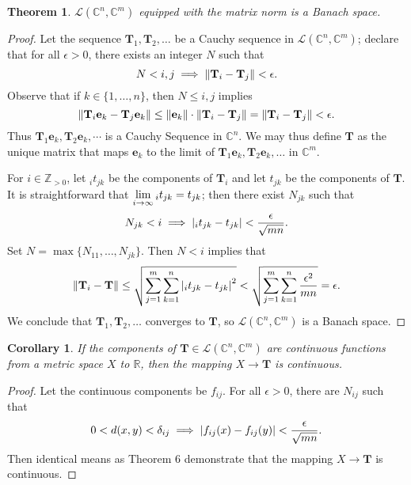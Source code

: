 \documentclass[11pt]{article}
\renewcommand{\vec}[1]{\mathbf{#1}}
\newcommand{\mat}[1]{\mathbf{#1}}
\newtheorem{theorem}{Theorem}
\newtheorem{corollary}{Corollary}
\begin{document}
\begin{theorem}
	$\mathcal{L}(\mathbb{C}^{n}, \mathbb{C}^{m})$ equipped with the matrix norm is a Banach space.
\end{theorem}
\begin{adjustwidth}{0.5cm}{}
    \begin{proof}
		Let the sequence $\mat{T}_{1}, \mat{T}_{2}, \ldots$ be a Cauchy sequence in $\mathcal{L}(\mathbb{C}^{n}, \mathbb{C}^{m})$; declare that for all $\epsilon > 0$, there exists an integer $N$ such that
		\[
			N < i, j \implies \norm{\mat{T}_{i} - \mat{T}_{j}} < \epsilon.
		\]
		Observe that if $k \in \{ 1, \ldots, n \}$, then $N \le i, j$ implies
		\[
			\norm{\mat{T}_{i} \vec{e}_{k} - \mat{T}_{j} \vec{e}_{k}} \le \norm{\vec{e}_{k}} \cdot \norm{\mat{T}_{i} - \mat{T}_{j}} = \norm{\mat{T}_{i} - \mat{T}_{j}} < \epsilon.
		\]
		Thus $\mat{T}_{1} \vec{e}_{k}, \mat{T}_{2} \vec{e}_{k}, \cdots$ is a Cauchy Sequence in $\mathbb{C}^{n}$. We may thus define $\mat{T}$ as the unique matrix that maps $\vec{e}_{k}$ to the limit of $\mat{T}_{1} \vec{e}_{k}, \mat{T}_{2} \vec{e}_{k}, \ldots$ in $\mathbb{C}^{m}$.
		
		For $i \in \mathbb{Z}_{> 0}$, let $_{i} t_{jk}$ be the components of $\mat{T}_{i}$ and let $t_{jk}$ be the components of $\mat{T}$. It is straightforward that $\lim\limits_{i \to \infty} \null_{i} t_{jk} = t_{jk}$; then there exist $N_{jk}$ such that
		\[
			N_{jk} < i \implies \abs{_{i} t_{jk} - t_{jk}} < \frac{\epsilon}{\sqrt{mn}}.
		\]
		Set $N = \max \{ N_{11}, \ldots, N_{jk} \}$. Then $N < i$ implies that
		\[
			\norm{\mat{T}_{i} - \mat{T}} \le \sqrt{\sum\limits_{j = 1}^{m} \sum\limits_{k = 1}^{n} \abs{_{i} t_{jk} - t_{jk}}^{2}} < \sqrt{\sum\limits_{j = 1}^{m} \sum\limits_{k = 1}^{n} \frac{\epsilon^{2}}{mn}} = \epsilon.
		\]
		We conclude that $\mat{T}_{1}, \mat{T}_{2}, \ldots$ converges to $\mat{T}$, so $\mathcal{L}(\mathbb{C}^{n}, \mathbb{C}^{m})$ is a Banach space.
	\end{proof}
\end{adjustwidth}

\begin{corollary}
	If the components of $\mat{T} \in \mathcal{L}(\mathbb{C}^{n}, \mathbb{C}^{m})$ are continuous functions from a metric space $X$ to $\mathbb{R}$, then the mapping $X \to \mat{T}$ is continuous.
\end{corollary}
\begin{adjustwidth}{0.5cm}{}
	\begin{proof}
		Let the continuous components be $f_{ij}$. For all $\epsilon > 0$, there are $N_{ij}$ such that
		\[
			0 < d(x, y) < \delta_{ij} \implies \abs{f_{ij}(x) - f_{ij}(y)} < \frac{\epsilon}{\sqrt{mn}}.
		\]
		Then identical means as Theorem 6 demonstrate that the mapping $X \to \mat{T}$ is continuous.
	\end{proof}
\end{adjustwidth}
\end{document}
